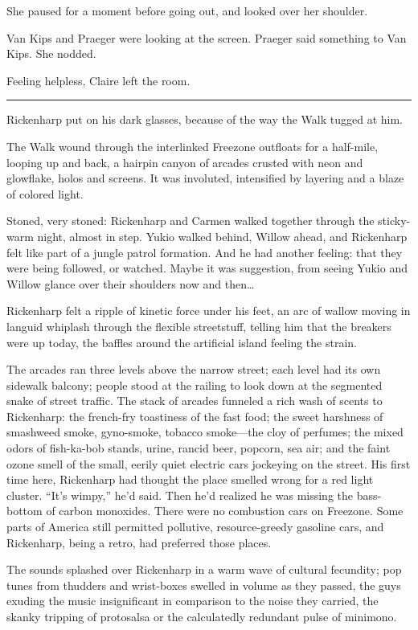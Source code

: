 She paused for a moment before going out, and looked over her shoulder.

Van Kips and Praeger were looking at the screen. Praeger said something to Van Kips. She nodded.

Feeling helpless, Claire left the room.

\fancybreak{* * *}

Rickenharp put on his dark glasses, because of the way the Walk tugged at him.

The Walk wound through the interlinked Freezone outfloats for a half-mile, looping up and back, a hairpin canyon of arcades crusted with neon and glowflake, holos and screens. It was involuted, intensified by layering and a blaze of colored light.

Stoned, very stoned: Rickenharp and Carmen walked together through the sticky-warm night, almost in step. Yukio walked behind, Willow ahead, and Rickenharp felt like part of a jungle patrol formation. And he had another feeling: that they were being followed, or watched. Maybe it was suggestion, from seeing Yukio and Willow glance over their shoulders now and then\ldots

Rickenharp felt a ripple of kinetic force under his feet, an arc of wallow moving in languid whiplash through the flexible streetstuff, telling him that the breakers were up today, the baffles around the artificial island feeling the strain.

The arcades ran three levels above the narrow street; each level had its own sidewalk balcony; people stood at the railing to look down at the segmented snake of street traffic. The stack of arcades funneled a rich wash of scents to Rickenharp: the french-fry toastiness of the fast food; the sweet harshness of smashweed smoke, gyno-smoke, tobacco smoke---the cloy of perfumes; the mixed odors of fish-ka-bob stands, urine, rancid beer, popcorn, sea air; and the faint ozone smell of the small, eerily quiet electric cars jockeying on the street. His first time here, Rickenharp had thought the place smelled wrong for a red light cluster. ``It's wimpy,'' he'd said. Then he'd realized he was missing the bass-bottom of carbon monoxides. There were no combustion cars on Freezone. Some parts of America still permitted pollutive, resource-greedy gasoline cars, and Rickenharp, being a retro, had preferred those places.

The sounds splashed over Rickenharp in a warm wave of cultural fecundity; pop tunes from thudders and wrist-boxes swelled in volume as they passed, the guys exuding the music insignificant in comparison to the noise they carried, the skanky tripping of protosalsa or the calculatedly redundant pulse of minimono.

